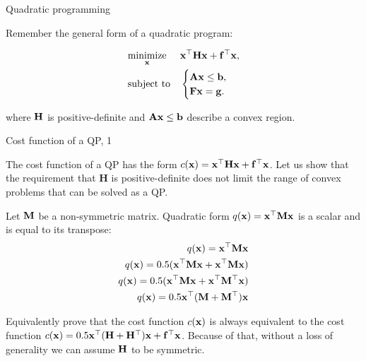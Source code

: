 \documentclass{beamer}
\begin{document}
\begin{frame}{Quadratic programming}
\begin{flushleft}

Remember the general form of a quadratic program:

%
\begin{equation}
	\begin{aligned}
		& \underset{\mathbf{x}}{\text{minimize}}
		& & \mathbf{x}^\top \mathbf{H} \mathbf{x} + \mathbf{f}^\top\mathbf{x}, \\
		& \text{subject to}
		& & \begin{cases}
			\mathbf{A}\mathbf{x} \leq \mathbf{b}, \\
			\mathbf{F}\mathbf{x} = \mathbf{g}.
		\end{cases}
	\end{aligned}
\end{equation}

where $\mathbf{H}$ is positive-definite and $\mathbf{A}\mathbf{x} \leq \mathbf{b}$ describe a convex region.
 
\end{flushleft}
\end{frame}




\begin{frame}{Cost function of a QP, 1}
	\begin{flushleft}
		
		The cost function of a QP has the form $c(\mathbf{x}) = \mathbf{x}^\top \mathbf{H} \mathbf{x} + \mathbf{f}^\top\mathbf{x}$. Let us show that the requirement that $\mathbf{H}$ is positive-definite does not limit the range of convex problems that can be solved as a QP.
		
		\bigskip
		
		Let $\mathbf{M}$ be a non-symmetric matrix. Quadratic form $q(\mathbf{x}) = \mathbf{x}^\top \mathbf{M} \mathbf{x}$ is a scalar and is equal to its transpose:
		\begin{align}
			q(\mathbf{x}) = \mathbf{x}^\top \mathbf{M} \mathbf{x} \\
			q(\mathbf{x}) = 0.5 (\mathbf{x}^\top \mathbf{M} \mathbf{x} + \mathbf{x}^\top \mathbf{M} \mathbf{x}) \\
			q(\mathbf{x}) = 0.5 (\mathbf{x}^\top \mathbf{M} \mathbf{x} + \mathbf{x}^\top \mathbf{M}^\top \mathbf{x}) \\
			q(\mathbf{x}) = 0.5 \mathbf{x}^\top( \mathbf{M} + \mathbf{M}^\top )\mathbf{x}
		\end{align}
	
		Equivalently prove that the cost function $c(\mathbf{x})$ is always equivalent to the cost function $c(\mathbf{x}) = 0.5 \mathbf{x}^\top (\mathbf{H} + \mathbf{H}^\top) \mathbf{x} + \mathbf{f}^\top\mathbf{x}$. Because of that, without a loss of generality we can assume $\mathbf{H}$ to be symmetric.
		
	\end{flushleft}
\end{frame}
\end{document}
